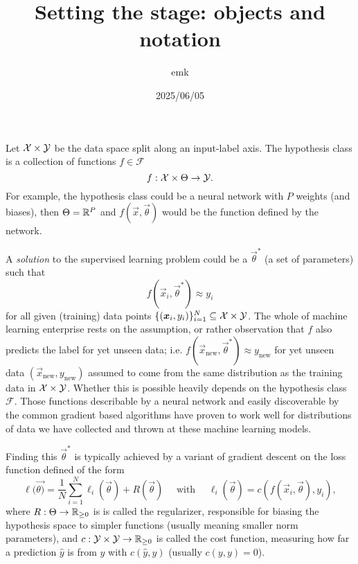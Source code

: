 \documentclass[12pt]{amsart}
\title{Setting the stage: objects and notation}
\author{emk}
\date{2025/06/05}
\begin{document}
\maketitle

Let $\mathcal{X} \times \mathcal{Y}$ be the data space split along an input-label axis. The hypothesis class is a collection of functions $f \in \mathcal{F}$
\[
	f : \mathcal{X} \times \Theta \to \mathcal{Y}.
\]
For example, the hypothesis class could be a neural network with $P$ weights (and biases), then $\Theta = \mathbb{R}^P$ and $f(\vec{x}, \vec{\theta})$ would be the function defined by the network.

A \emph{solution} to the supervised learning problem could be a $\vec{\theta}^*$ (a set of parameters) such that $$f(\vec{x}_i, \vec{\theta}^*) \approx y_i$$
for all given (training) data points $\{(\mathbf{\boldsymbol{x}}_i, y_i)\}_{i = 1}^N \subseteq \mathcal{X} \times \mathcal{Y}$. The whole of machine learning enterprise rests on the assumption, or rather observation that $f$ also predicts the label for yet unseen data; i.e. $f(\vec{x}_{\text{new}}, \vec{\theta}^*) \approx y_{\text{new}}$ for yet unseen data $(\vec{x}_{\text{new}}, y_{\text{new}})$ assumed to come from the same distribution as the training data in $\mathcal{X} \times \mathcal{Y}$. Whether this is possible heavily depends on the hypothesis class $\mathcal{F}$. Those functions describable by a neural network and easily discoverable by the common gradient based algorithms have proven to work well for distributions of data we have collected and thrown at these machine learning models.

Finding this $\vec \theta^*$ is typically achieved by a variant of gradient descent on the loss function defined of the form
\begin{equation}\label{eq:lossfn}
	\ell(\vec{\theta)} = \frac{1}{N} \sum_{i = 1}^N \ell_i(\vec{\theta}) + R(\vec{\theta}) \quad \text{ with } \quad \ell_i(\vec{\theta}) = c(f(\vec{x}_i, \vec{\theta}), y_i),
\end{equation}
where $R :\Theta \to \mathbb{R}_{\geq 0 }$ is is called the regularizer, responsible for biasing the hypothesis space to simpler functions (usually meaning smaller norm parameters), and $c : \mathcal{Y} \times \mathcal{Y} \to \mathbb{R}_{\geq 0}$ is called the cost function, measuring how far a prediction $\hat y$ is from $y$ with  $c(\hat y, y)$ (usually $c(y, y) = 0$). 
\end{document}
